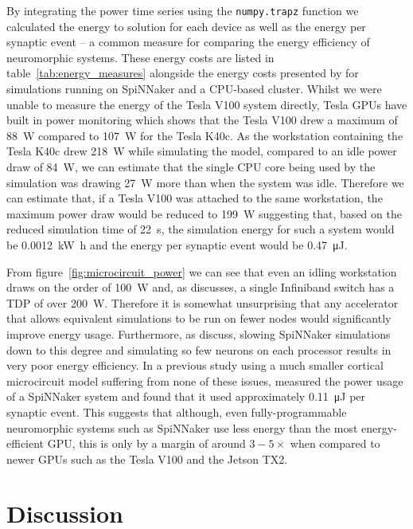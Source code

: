 \documentclass[utf8]{frontiersSCNS} %
\begin{document}
By integrating the power time series using the \lstinline{numpy.trapz} function we calculated the energy to solution for each device as well as the energy per synaptic event -- a common measure for comparing the energy efficiency of neuromorphic systems.
These energy costs are listed in table~\ref{tab:energy_measures} alongside the energy costs presented by \citet{VanAlbada2018} for simulations running on SpiNNaker and a CPU-based cluster.
Whilst we were unable to measure the energy of the Tesla V100 system directly, Tesla GPUs have built in power monitoring which shows that the Tesla V100 drew a maximum of \SI{88}{\watt} compared to \SI{107}{\watt} for the Tesla K40c.
As the workstation containing the Tesla K40c drew \SI{218}{\watt} while simulating the model, compared to an idle power draw of \SI{84}{\watt}, we can estimate that the single CPU core being used by the simulation was drawing \SI{27}{\watt} more than when the system was idle.
Therefore we can estimate that, if a Tesla V100 was attached to the same workstation, the maximum power draw would be reduced to \SI{199}{\watt} suggesting that, based on the reduced simulation time of \SI{22}{\second}, the simulation energy for such a system would be \SI{0.0012}{\kilo\watt\hour} and the energy per synaptic event would be \SI{0.47}{\micro\joule}.

From figure~\ref{fig:microcircuit_power} we can see that even an idling workstation draws on the order of \SI{100}{\watt} and, as \citeauthor{VanAlbada2018} discusses, a single Infiniband switch has a TDP of over \SI{200}{\watt}.
Therefore it is somewhat unsurprising that any accelerator that allows equivalent simulations to be run on fewer nodes would significantly improve energy usage.
Furthermore, as \citeauthor{VanAlbada2018} discuss, slowing SpiNNaker simulations down to this degree and simulating so few neurons on each processor results in very poor energy efficiency.
In a previous study using a much smaller cortical microcircuit model suffering from none of these issues, \citet{Sharp2012} measured the power usage of a SpiNNaker system and found that it used approximately \SI{0.11}{\micro\joule} per synaptic event.
This suggests that although, even fully-programmable neuromorphic systems such as SpiNNaker use less energy than the most energy-efficient GPU, this is only by a margin of around $3-5\times$ when compared to newer GPUs such as the Tesla V100 and the Jetson TX2.

\section{Discussion}
\end{document}
